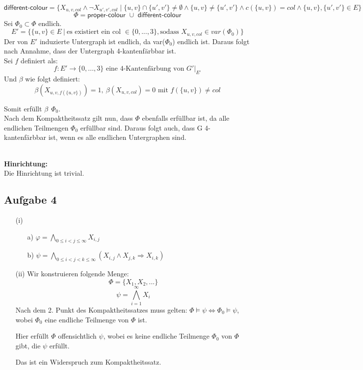 \documentclass[a4paper,10pt]{article}
\begin{document}
	\[\textsf{different-colour} = 
	 \{ X_{u,v,col} \wedge \neg X_{u',v',col}\mid
	\{ u,v \} \cap \{ u',v' \} \neq \emptyset \wedge 
	\{ u,v \} \neq \{ u',v' \} \wedge 
	c(\{ u,v \}) = col \wedge 
	\{u,v\},\{u',v'\} \in E \} \] 
	\[\Phi = \textsf{proper-colour } \cup \textsf{ different-colour} \]
	Sei $\Phi_0 \subset \Phi$ endlich. 
	\[E' = \{ \{u,v\} \in E~|~\text{es existiert ein col } \in \{0,...,3\}, \text{sodass } X_{u,v,col} \in var(\Phi_0) \}\] 
	Der von $E'$ induzierte Untergraph ist endlich, da var($\Phi_0$) endlich ist. Daraus folgt nach Annahme, dass der Untergraph 4-kantenfärbbar ist.\\
	Sei $f$ definiert als:
	\[f: E' \rightarrow \{0,...,3\} \text{ eine 4-Kantenfärbung von } G' |_{E'}\]
	Und $\beta$ wie folgt definiert: \\
	\[\beta(X_{u,v,f(\{ u,v \})}) = 1,~\beta(X_{u,v,col}) = 0 \text{ mit } f(\{ u,v \}) \neq col \] 

	Somit erfüllt $\beta~~\Phi_0$.\\
	Nach dem Kompaktheitssatz gilt nun, dass $\Phi$ ebenfalls erfüllbar ist, da alle endlichen Teilmengen $\Phi_0$ erfüllbar sind. Daraus folgt auch, dass G 4-kantenfärbbar ist, wenn es alle endlichen Untergraphen sind.
	
	\ \\ \textbf{Hinrichtung:} \\
	Die Hinrichtung ist trivial.
	
	\subsection*{Aufgabe 4}
	\begin{enumerate}
	\item[(i)]
		\begin{enumerate}
		\item[a)]
		\(\varphi = \bigwedge\limits_{0 \leq i < j \leq \infty} X_{i,j} \)
						
		\item[b)]
		\( \psi = \bigwedge\limits_{0 \leq i < j < k \leq \infty}(X_{i,j} \wedge X_{j,k} \Rightarrow X_{i,k}) \)
		
		\end{enumerate}
	\item[(ii)]
	Wir konstruieren folgende Menge: 
	$$ \Phi = \{X_1,X_2,...\}$$
	$$\psi = \bigwedge_{i=1}^{\infty} X_i $$
	Nach dem 2. Punkt des Kompaktheitssatzes muss gelten: $\Phi \models \psi \Leftrightarrow \Phi_0 \models \psi$, wobei $\Phi_0$ eine endliche Teilmenge von $\Phi$ ist.

	Hier erfüllt $\Phi$ offensichtlich $\psi$, wobei es keine endliche Teilmenge $\Phi_0$ von $\Phi$ gibt, die $\psi$ erfüllt. 

	Das ist ein Widerspruch zum Kompaktheitssatz.
 
	\end{enumerate}
\end{document}
